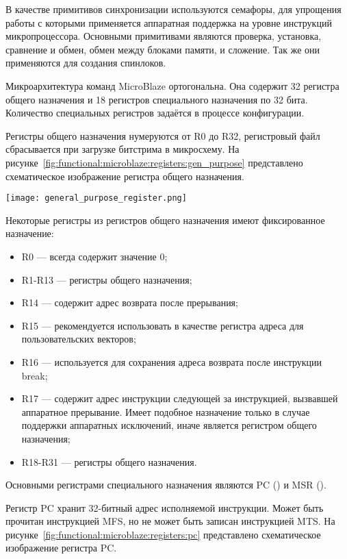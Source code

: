 В качестве примитивов синхронизации используются семафоры, для упрощения работы с которыми
применяется аппаратная поддержка на уровне инструкций микропроцессора. Основными примитивами
являются проверка, установка, сравнение и обмен, обмен между блоками памяти, и сложение.
Так же они применяются для создания спинлоков.

Микроархитектура команд MicroBlaze ортогональна. Она содержит 32 регистра общего назначения
и 18 регистров специального назначения по 32 бита. Количество специальных регистров задаётся
в процессе конфигурации.

Регистры общего назначения нумеруются от R0 до R32, регистровый файл сбрасывается при загрузке
битстрима в микросхему. На рисунке~\ref{fig:functional:microblaze:registers:gen_purpose} представлено
схематическое изображение регистра общего назначения.

\begin{center}
  \centering
  \texttt{[image: general\_purpose\_register.png]}
  \label{fig:functional:microblaze:registers:gen_purpose}
\end{center}

Некоторые регистры из регистров общего назначения имеют фиксированное назначение:
\begin{itemize}
  \item R0 --- всегда содержит значение 0;
  \item R1-R13 --- регистры общего назначения;
  \item R14 --- содержит адрес возврата после прерывания;
  \item R15 --- рекомендуется использовать в качестве регистра
    адреса для пользовательских векторов;
  \item R16 --- используется для сохранения адреса возврата после инструкции break;
  \item R17 --- содержит адрес инструкции следующей за инструкцией, вызвавшей аппаратное
    прерывание. Имеет подобное назначение только в случае поддержки аппаратных исключений,
    иначе является регистром общего назначения;
  \item R18-R31 --- регистры общего назначения.
\end{itemize}

Основными регистрами специального назначения являются PC () и MSR ().

Регистр PC хранит 32-битный адрес исполняемой инструкции. Может быть прочитан инструкцией MFS,
но не может быть записан инструкцией MTS. На рисунке~\ref{fig:functional:microblaze:registers:pc} представлено
схематическое изображение регистра PC.


